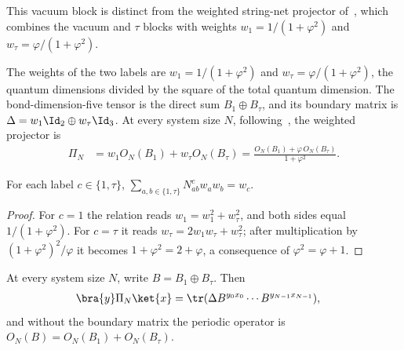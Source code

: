 This vacuum block is distinct from the weighted string-net projector
of~\cite[Appendix~D.1]{Bultinck2017Anyons}, which combines the vacuum and
$\tau$ blocks with weights $w_1=1/(1+\varphi^2)$ and
$w_\tau=\varphi/(1+\varphi^2)$.

\begin{definition}
    \label{def:asymex_fib_projector}
    \leanok
    The weights of the two labels are
    $w_1=1/(1+\varphi^2)$ and $w_\tau=\varphi/(1+\varphi^2)$, the quantum
    dimensions divided by the square of the total quantum dimension.
    The bond-dimension-five tensor is the direct sum $B_1\oplus B_\tau$,
    and its boundary matrix is
    $\Delta=w_1\Id_2\oplus w_\tau\Id_3$. At every system size $N$,
    following~\cite[Sections~3.1 and~3.2 and Appendix~D.1]{Bultinck2017Anyons},
    the weighted projector is
    \begin{align}
        \Pi_N & =w_1O_N(B_1)+w_\tau O_N(B_\tau)
        =\frac{O_N(B_1)+\varphi\,O_N(B_\tau)}{1+\varphi^2}.
        \label{eq:asymex_fib_projector}
    \end{align}
\end{definition}

\begin{lemma}
    \label{thm:asymex_fib_projector_weights}
    \leanok
    For each label $c\in\{1,\tau\}$,
    $\sum_{a,b\in\{1,\tau\}}N_{ab}^cw_aw_b=w_c$.
\end{lemma}

\begin{proof}
    \leanok
    For $c=1$ the relation reads $w_1=w_1^2+w_\tau^2$, and both
    sides equal $1/(1+\varphi^2)$. For $c=\tau$ it reads
    $w_\tau=2w_1w_\tau+w_\tau^2$; after multiplication by
    $(1+\varphi^2)^2/\varphi$ it becomes $1+\varphi^2=2+\varphi$, a
    consequence of $\varphi^2=\varphi+1$.
\end{proof}

\begin{lemma}
    \label{thm:asymex_fib_projector_trace}
    \leanok
    At every system size $N$, write $B=B_1\oplus B_\tau$. Then
    \begin{align}
        \bra{y}\Pi_N\ket{x}
         & =\tr(\Delta B^{y_0x_0}\cdots B^{y_{N-1}x_{N-1}}),
        \label{eq:asymex_fib_projector_trace}
    \end{align}
    and without the boundary matrix the periodic operator is
    $O_N(B)=O_N(B_1)+O_N(B_\tau)$.
\end{lemma}


